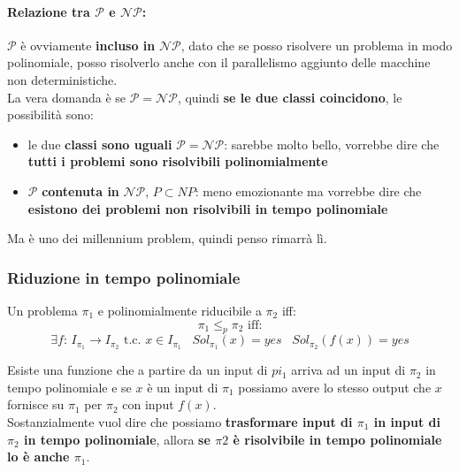 \documentclass[11pt]{article}
\begin{document}
	\newpage
	
	\paragraph{Relazione tra $\mathcal{P}$ e $\mathcal{NP}$:} $\mathcal{P}$ è ovviamente \textbf{incluso in} $\mathcal{NP}$, dato che se posso risolvere un problema in modo polinomiale, posso risolverlo anche con il parallelismo aggiunto delle macchine non deterministiche.\\
	
	La vera domanda è se $\mathcal{P} = \mathcal{NP}$, quindi \textbf{se le due classi coincidono}, le possibilità sono: 
	\begin{itemize}
		\item le due \textbf{classi sono uguali} $\mathcal{P} = \mathcal{NP}$: sarebbe molto bello, vorrebbe dire che \textbf{tutti i problemi sono risolvibili polinomialmente}
		\item $\mathcal{P}$ \textbf{contenuta in} $\mathcal{NP}$, $P \subset NP$: meno emozionante ma vorrebbe dire che \textbf{esistono dei problemi non risolvibili in tempo polinomiale}
	\end{itemize}
	Ma è uno dei millennium problem, quindi penso rimarrà lì.\\
	
	\subsubsection{Riduzione in tempo polinomiale}
	
	Un problema $\pi_1$ e polinomialmente riducibile a $\pi_2$ iff: 
	$$ \pi_1 \leq_p \pi_2 \text{ iff:}$$
	$$ \exists f : \, I_{\pi_1} \rightarrow I_{\pi_2} \text{ t.c. } x \in I_{\pi_1} \;\;\; Sol_{\pi_1} (x) = yes \;\;\; Sol_{\pi_2} (f(x)) = yes $$ 
	
	Esiste una funzione che a partire da un input di $pi_1$ arriva ad un input di $\pi_2$ in tempo polinomiale e se $x$ è un input di $\pi_1$ possiamo avere lo stesso output che $x$ fornisce su $\pi_1$ per $\pi_2$ con input $f(x)$. \\
	
	Sostanzialmente vuol dire che possiamo \textbf{trasformare input di $\pi_1$ in input di $\pi_2$ in tempo polinomiale}, allora \textbf{se $\pi 2$ è risolvibile in tempo polinomiale lo è anche $\pi_1$}.\\
	
\end{document}
